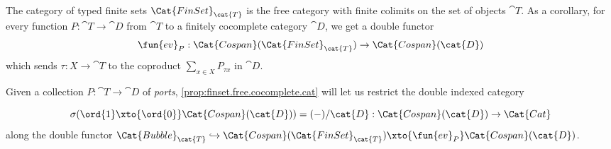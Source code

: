 \documentclass[DynamicalBook]{subfiles}
\begin{document}
\begin{proposition}\label{prop:finset.free.cocomplete.cat}
  The category of typed finite sets $\Cat{FinSet}_{\cat{T}}$ is the free category with finite colimits on the set of objects $\cat{T}$. As a corollary, for every function $P : \cat{T} \to \cat{D}$ from $\cat{T}$ to a finitely cocomplete category $\cat{D}$, we get a double functor
  \[
   \fun{ev}_{P} :  \Cat{Cospan}(\Cat{FinSet}_{\cat{T}}) \to \Cat{Cospan}(\cat{D})
  \]
  which sends $\tau : X \to \cat{T}$ to the coproduct $\sum_{x \in X} P_{\tau x}$ in $\cat{D}$.
\end{proposition}

Given a collection $P : \cat{T} \to \cat{D}$ of \emph{ports}, \cref{prop:finset.free.cocomplete.cat} will let us restrict the double indexed category

$$\sigma(\ord{1} \xto{\ord{0}} \Cat{Cospan}(\cat{D})) = (-)/\cat{D} : \Cat{Cospan}(\cat{D}) \to \Cat{Cat}$$
along the double functor $\Cat{Bubble}_{\cat{T}} \hookrightarrow \Cat{Cospan}(\Cat{FinSet}_{\cat{T}}) \xto{\fun{ev}_{P}} \Cat{Cospan}(\cat{D})$.
\end{document}

